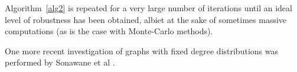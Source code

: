 \documentclass[doc]{apa}%
\begin{document}
Algorithm~\ref{alg2} is repeated for a very large number of iterations until an ideal level of robustness has been obtained, albiet at the sake of sometimes massive computations (as is the case with Monte-Carlo methods).


One more recent investigation of graphs with fixed degree distributions was performed by Sonawane et al \cite{bimodal}. 

%


\end{document}
